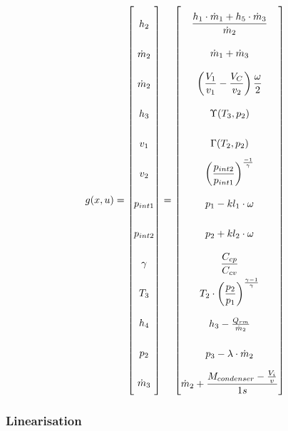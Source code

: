 \begin{equation} \label{eq:consump_x}\renewcommand{\arraystretch}{2.5}
	g(x,u) =  \begin{bmatrix}
		h_{2}\\
		\dot{m}_{2} \\
		\dot{m}_2   \\
		h_{3}		\\
		v_1			\\
		v_2			\\
		p_{int1}			\\
		p_{int2}			\\
		\gamma					\\
		T_{3}					\\
		h_{4}					\\
		p_{2}					\\
		\dot{m}_{3}			\\
	\end{bmatrix}
	=
	\begin{bmatrix}
		\dfrac{h_{1} \cdot \dot{m}_{1} + h_{5} \cdot \dot{m}_{3}}{ \dot{m}_{2} } \\ 	%
		\dot{m}_{1} + \dot{m}_{3} \\													%
		 \left(\dfrac{V_1}{v_1} - \dfrac{V_C}{v_2}\right) \dfrac{\omega}{2} \\			%
		 \Upsilon(T_{3}, p_{2})		\\													%
		 \Gamma(T_{2},p_{2}) \\															%
		 \left(\dfrac{p_{int2}}{p_{int1}}\right)^{\frac{-1}{\gamma}} \\					%
		 p_{1} - kl_1 \cdot \omega \\													%
		 p_{2} + kl_2 \cdot \omega \\													%
		 \dfrac{C_{cp}}{C_{cv}} \\														%
		 T_{2}\cdot \left(\dfrac{p_{2}}{p_{1}}\right)^{\frac{\gamma-1}{\gamma}}	\\		%
		 h_{3} - \frac{Q_{rm}}{\dot{m}_{2}}	\\										%
		 p_{3} - \lambda \cdot \dot{m}_{2}			\\							%
		 \dot{m}_{2} + \dfrac{M_{condenser} - \frac{V_i}{v}}{1s}	\\							%
	\end{bmatrix}
\end{equation}


\newpage
\subsubsection{Linearisation}